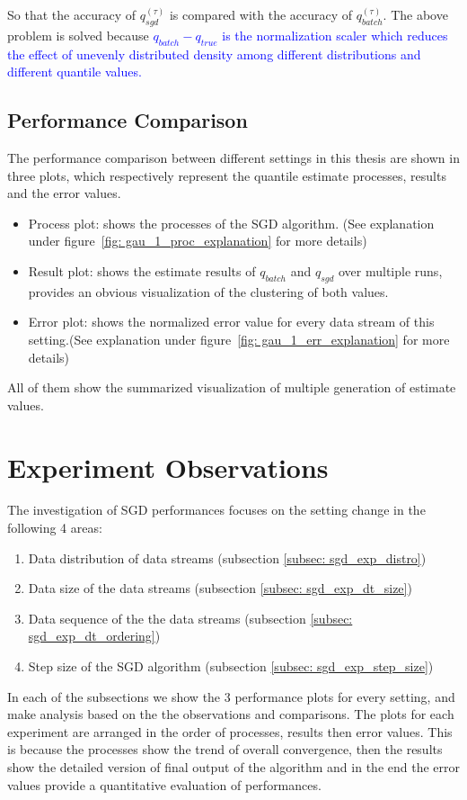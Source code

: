 So that the accuracy of $q_{sgd}^{(\tau)}$ is compared with the accuracy of $q_{batch}^{(\tau)}$. The above problem is solved because 
\textcolor{blue}{
    $
    q_{batch} - q_{true}
    $
    is the normalization scaler which reduces the effect of unevenly distributed density among different distributions and different quantile values.
}

\subsection{Performance Comparison}
The performance comparison between different settings in this thesis are shown in three plots, which respectively represent
the quantile estimate processes, results and the error values.
\begin{itemize}
    \item Process plot: shows the processes of the SGD algorithm. (See explanation under figure~\ref{fig: gau_1_proc_explanation} for more details)
    \item Result plot: shows the estimate results of $q_{batch}$ and $q_{sgd}$ over multiple runs, provides an obvious visualization of the clustering of both values.
    \item Error plot: shows the normalized error value for every data stream of this setting.(See explanation under figure~\ref{fig: gau_1_err_explanation} for more details)
\end{itemize}

All of them show the summarized visualization of multiple generation of estimate values.


\pagebreak
\section{Experiment Observations}
\label{sec: observations}

The investigation of SGD performances focuses on the setting change in the following 4 areas:
    \begin{enumerate}
        \item Data distribution of data streams (subsection \ref{subsec: sgd_exp_distro})
        \item Data size of the data streams (subsection \ref{subsec: sgd_exp_dt_size})
        \item Data sequence of the the data streams  (subsection \ref{subsec: sgd_exp_dt_ordering})
        \item Step size of the SGD algorithm (subsection \ref{subsec: sgd_exp_step_size})
    \end{enumerate}
In each of the subsections we show the 3 performance plots for every setting, and make analysis based on the the observations and comparisons. The plots for each experiment are arranged in the order of processes, results then error values. This is because the processes show the trend of overall convergence, then the results show the detailed version of final output of the algorithm and in the end the error values provide a quantitative evaluation of performances. 

